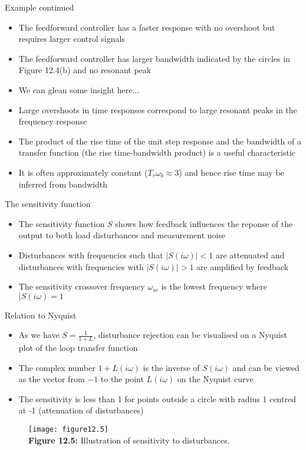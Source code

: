 \documentclass{beamer-control}
\begin{document}
\begin{frame}{Example continued}
\begin{itemize}
	\item The feedforward controller has a faster response with no overshoot but requires larger control signals
	\item The feedforward controller has larger bandwidth indicated by the circles in Figure 12.4(b) and no resonant peak
	\item We can glean some insight here...
	\item Large overshoots in time responses correspond to large resonant peaks in the frequency response
	\item The product of the rise time of the unit step response and the bandwidth of a transfer function (the rise time-bandwidth product) is a useful characteristic 
	\item It is often approximately constant ($T_r\omega_b\approx 3$) and hence rise time may be inferred from bandwidth
\end{itemize}
\end{frame}


\begin{frame}{The sensitivity function}
\begin{itemize}
\item The sensitivity function $S$ shows how feedback influences the reponse of the output to both load disturbances and measurement noise
\item Disturbances with frequencies such that $|S(i\omega)|<1$ are attenuated and disturbances with frequencies with $|S(i\omega)|>1$ are amplified by feedback
\item The sensitivity crossover frequency $\omega_{sc}$ is the lowest frequency where $|S(i\omega)=1$
\end{itemize}
\end{frame}

\begin{frame}{Relation to Nyquist}
\begin{itemize}
	\item As we have $S=\tfrac{1}{1+L}$, disturbance rejection can be visualised on a Nyquist plot of the loop transfer function
	\item The complex number $1+L(i\omega)$ is the inverse of $S(i\omega)$ and can be viewed as the vector from $-1$ to the point $L(i\omega)$ on the Nyquist curve
	\item The sensitivity is less than 1 for points outside a circle with radius 1 centred at -1 (attenuation of disturbances)
\end{itemize}
\begin{figure}
	\centering
	\texttt{[image: figure12.5]}\\
	\vspace{-0.2cm}
	\textbf{Figure 12.5:} Illustration of sensitivity to disturbances.
\end{figure}
\end{frame}
\end{document}
